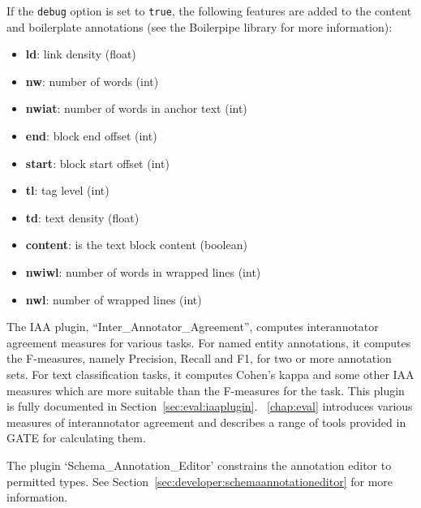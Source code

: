 If the \texttt{debug} option is set to \texttt{true}, the following features are added to the content and boilerplate annotations (see the Boilerpipe library for more information):
\begin{itemize}
 \item \textbf{ld}: link density (float)
 \item \textbf{nw}: number of words (int)
 \item \textbf{nwiat}: number of words in anchor text (int)
 \item \textbf{end}: block end offset (int)
 \item \textbf{start}: block start offset (int)
 \item \textbf{tl}: tag level (int)
 \item \textbf{td}: text density (float)
 \item \textbf{content}: is the text block content (boolean)
 \item \textbf{nwiwl}: number of words in wrapped lines (int)
 \item \textbf{nwl}: number of wrapped lines (int)
\end{itemize}



The IAA plugin, ``Inter\_Annotator\_Agreement'', computes interannotator
agreement measures for various tasks. For named entity annotations, it computes
the F-measures, namely Precision, Recall and F1, for two or more annotation
sets. For text classification tasks, it computes Cohen's kappa and some other
IAA measures which are more suitable than the F-measures for the task. This
plugin is fully documented in Section~\ref{sec:eval:iaaplugin}.
\Chapthing~\ref{chap:eval} introduces various measures of interannotator
agreement and describes a range of tools provided in GATE for calculating them.


The plugin `Schema\_Annotation\_Editor' constrains the annotation editor to
permitted types. See Section~\ref{sec:developer:schemaannotationeditor} for
more information.



